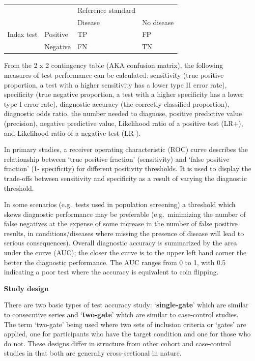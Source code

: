 \documentclass[
  11pt,
  a4paper,
  DIV=11,
  numbers=noendperiod]{scrreprt}
\begin{document}
\begin{longtable}[]{@{}llll@{}}
\toprule\noalign{}
\endhead
\bottomrule\noalign{}
\endlastfoot
& & Reference standard & \\
& & Disease & No disease \\
Index test & Positive & TP & FP \\
& Negative & FN & TN \\
\end{longtable}

From the 2 x 2 contingency table (AKA confusion matrix), the following
measures of test performance can be calculated: sensitivity (true
positive proportion, a test with a higher sensitivity has a lower type
II error rate), specificity (true negative proportion, a test with a
higher specificity has a lower type I error rate), diagnostic accuracy
(the correctly classified proportion), diagnostic odds ratio, the number
needed to diagnose, positive predictive value (precision), negative
predictive value, Likelihood ratio of a positive test (LR+), and
Likelihood ratio of a negative test (LR-).

In primary studies, a receiver operating characteristic (ROC) curve
describes the relationship between `true positive fraction'
(sensitivity) and `false positive fraction' (1- specificity) for
different positivity thresholds. It is used to display the trade-offs
between sensitivity and specificity as a result of varying the
diagnostic threshold.

In some scenarios (e.g.~tests used in population screening) a threshold
which skews diagnostic performance may be preferable (e.g.~minimizing
the number of false negatives at the expense of some increase in the
number of false positive results, in conditions/diseases where missing
the presence of disease will lead to serious consequences). Overall
diagnostic accuracy is summarized by the area under the curve (AUC); the
closer the curve is to the upper left hand corner the better the
diagnostic performance. The AUC ranges from 0 to 1, with 0.5 indicating
a poor test where the accuracy is equivalent to coin flipping.

\textbf{Study design}

There are two basic types of test accuracy study: `\textbf{single-gate}'
which are similar to consecutive series and `\textbf{two-gate}' which
are similar to case-control studies. The term `two-gate' being used
where two sets of inclusion criteria or `gates' are applied, one for
participants who have the target condition and one for those who do not.
These designs differ in structure from other cohort and case-control
studies in that both are generally cross-sectional in nature.
\end{document}
